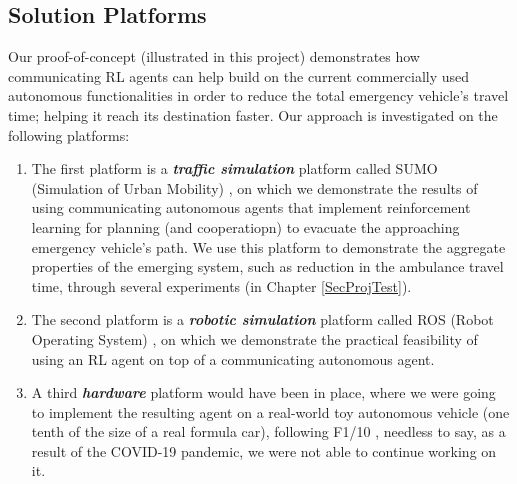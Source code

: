 \subsection{Solution Platforms}
\label{sec:solt_plat}
Our proof-of-concept (illustrated in this project) demonstrates how communicating RL agents can help build on the current commercially used autonomous functionalities in order to reduce the total emergency vehicle's travel time; helping it reach its destination faster. Our approach is investigated on the following platforms:
\begin{enumerate}
    \item The first platform is a \textbf{\textit{traffic simulation}} platform called SUMO (Simulation of Urban Mobility) \cite{sumomain}, on which we demonstrate the results of using communicating autonomous agents that implement reinforcement learning for planning (and cooperatiopn) to evacuate the approaching emergency vehicle's path. We use this platform to demonstrate the aggregate properties of the emerging system, such as reduction in the ambulance travel time, through several experiments (in Chapter \ref{SecProjTest}).
    
    \item The second platform is a \textbf{\textit{robotic simulation }} platform called ROS (Robot Operating System) \cite{ROSBookMorgan}, on which we demonstrate the practical feasibility of using an RL agent on top of a communicating autonomous agent.
    
    \item A third \textbf{\textit{hardware}} platform would have been in place, where we were going to implement the resulting agent on a real-world toy autonomous vehicle (one tenth of the size of a real formula car), following F1/10 \cite{okelly2019f110}, needless to say, as a result of the COVID-19 pandemic, we were not able to continue working on it.
\end{enumerate}

